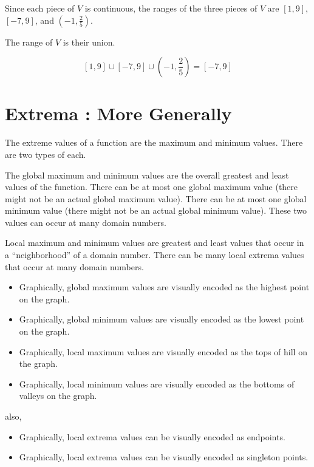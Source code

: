 \documentclass{ximera}
\begin{document}
Since each piece of $V$ is continuous, the ranges of the three pieces of $V$ are $[1, 9]$, $[-7, 9]$, and $\left( -1, \frac{2}{5} \right)$. 

The range of $V$ is their union.

\[
[1, 9] \cup [-7, 9] \cup \left( -1, \frac{2}{5} \right) = [-7, 9]
\]













\section*{Extrema : More Generally}


The extreme values of a function are the maximum and minimum values.  There are two types of each. 

The global maximum and minimum values are the overall greatest and least values of the function.  There can be at most one global maximum value (there might not be an actual global maximum value). There can be at most one global minimum value (there might not be an actual global minimum value).  These two values can occur at many domain numbers.


Local maximum and minimum values are greatest and least values that occur in a ``neighborhood'' of a domain number.  There can be many local extrema values that occur at many domain numbers. 


\begin{itemize}
\item Graphically, global maximum values are visually encoded as the highest point on the graph.
\item Graphically, global minimum values are visually encoded as the lowest point on the graph.
\item Graphically, local maximum values are visually encoded as the tops of hill on the graph.
\item Graphically, local minimum values are visually encoded as the bottoms of valleys on the graph.
\end{itemize}

also, 

\begin{itemize}
\item Graphically, local extrema values can be visually encoded as endpoints.
\item Graphically, local extrema values can be visually encoded as singleton points.
\end{itemize}
\end{document}
